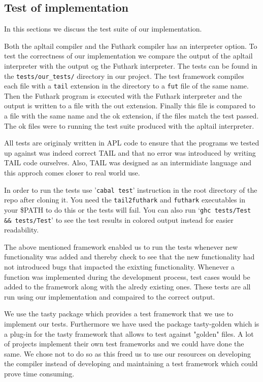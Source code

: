 \documentclass[11pt]{article}
\begin{document}
\subsection{Test of implementation}

In this sections we discuss the test suite of our implementation.

Both the apltail compiler and the Futhark compiler has an interpreter option.
To test the correctness of our implementation we compare the output of the apltail interpreter with the output og the Futhark interpreter.
The tests can be found in the {\tt tests/our\_tests/} directory in our project.
The test framework compiles each file with a {\tt tail} extension in the directory to a {\tt fut} file of the same name.
Then the Futhark program is executed with the Futhark interpreter and the output is written to a file with the out extension.
Finally this file is compared to a file with the same name and the ok extension, if the files match the test passed.
The ok files were to running the test suite produced with the apltail interpreter.

All tests are originaly written in APL code to ensure that the programs we tested up against was indeed correct TAIL and that no error was introduced by writing TAIL code ourselves. Also, TAIL was designed as an intermidiate language and this approch comes closer to real world use.

In order to run the tests use '{\tt cabal test}' instruction in the root directory of the repo after cloning it. 
You need the {\tt tail2futhark} and {\tt futhark} executables in your \$PATH to do this or the tests will fail. 
You can also run `{\tt ghc tests/Test \&\& tests/Test}' to see the test results in colored output instead for easier readability.

The above mentioned framework enabled us to run the tests whenever new functionality was added and thereby check to see that the new functionality had not introduced bugs that impacted the exixting functionality. 
Whenever a function was implemented during the development process, test cases would be added to the framework along with the alredy existing ones. These tests are all run using our implementation and compaired to the correct output.

We use the tasty package \cite{tasty} which provides a test framework that we use to implement our tests. Furthermore we have used the
package tasty-golden \cite{tasty-golden} which is a plug-in for the tasty framework that allows to test against "golden" files.
A lot of projects implement their own test frameworks and we could have done the same.
We chose not to do so as this freed us to use our resources on developing the compiler instead of developing and maintaining a
test framework which could prove time consuming.
\end{document}
